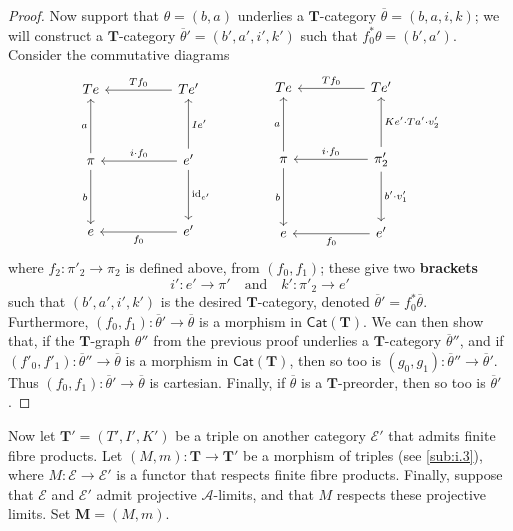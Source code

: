 \documentclass{article}
\newcommand{\unsure}[1]{{\color{purple}\textbf{#1}}}
\newcommand{\id}{\mathrm{id}}
\newcommand{\TT}{\mathbf{T}}
\newcommand{\MM}{\mathbf{M}}
\newcommand{\textand}{\quad\text{and}\quad}
\newcommand{\cat}[1]{\mathcal{#1}}
\newcommand{\Cat}[1]{\mathsf{#1}}
\begin{document}
\begin{proof}
  Now support that $\theta=(b,a)$ underlies a $\TT$-category $\overline{\theta}=(b,a,i,k)$;
  we will construct a $\TT$-category $\overline{\theta}'=(b',a',i',k')$ such that $f_0^*\theta=(b',a')$.
  Consider the commutative diagrams
  \[
    \begin{tikzcd}[sep=huge]
      Te
    & Te'
        \ar[l,swap,"Tf_0"]
    \\\pi
        \ar[u,"a"]
        \ar[d,swap,"b"]
    & e'
        \ar[u,swap,"Ie'"]
        \ar[l,swap,"i\cdot f_0"]
        \ar[d,"\id_{e'}"]
    \\e
    & e'
        \ar[l,"f_0"]
    \end{tikzcd}
    \qquad\qquad
    \begin{tikzcd}[sep=huge]
      Te
    & Te'
        \ar[l,swap,"Tf_0"]
    \\\pi
        \ar[u,"a"]
        \ar[d,swap,"b"]
    & \pi'_2
        \ar[u,swap,"Ke'\cdot Ta'\cdot v'_2"]
        \ar[l,swap,"i\cdot f_0"]
        \ar[d,"b'\cdot v'_1"]
    \\e
    & e'
        \ar[l,"f_0"]
    \end{tikzcd}
  \]
  where $f_2\colon\pi'_2\to\pi_2$ is defined above, from $(f_0,f_1)$;
  these give two \unsure{brackets}
  \[
    i'\colon e'\to\pi'
    \textand
    k'\colon\pi'_2\to e'
  \]
  such that $(b',a',i',k')$ is the desired $\TT$-category, denoted $\overline{\theta}'=f_0^*\overline{\theta}$.
  Furthermore, $(f_0,f_1)\colon\overline{\theta}'\to\overline{\theta}$ is a morphism in $\Cat{Cat}(\TT)$.
  We can then show that, if the $\TT$-graph $\theta''$ from the previous proof underlies a $\TT$-category $\overline{\theta}''$, and if $(f'_0,f'_1)\colon\overline{\theta}''\to\overline{\theta}$ is a morphism in $\Cat{Cat}(\TT)$, then so too is $(g_0,g_1)\colon\overline{\theta}''\to\overline{\theta}'$.
  Thus $(f_0,f_1)\colon\overline{\theta}'\to\overline{\theta}$ is cartesian.
  Finally, if $\overline{\theta}$ is a $\TT$-preorder, then so too is $\overline{\theta}'$.
\end{proof}

Now let $\TT'=(T',I',K')$ be a triple on another category $\cat{E}'$ that admits finite fibre products.
Let $(M,m)\colon\TT\to\TT'$ be a morphism of triples (see \cref{sub:i.3}), where $M\colon\cat{E}\to\cat{E}'$ is a functor that respects finite fibre products.
Finally, suppose that $\cat{E}$ and $\cat{E}'$ admit projective $\cat{A}$-limits, and that $M$ respects these projective limits.
Set $\MM=(M,m)$.
\end{document}

